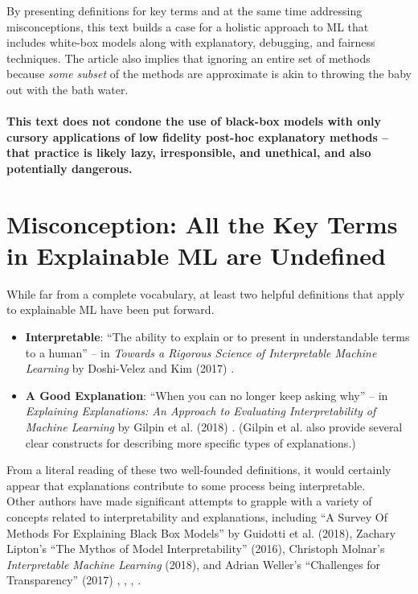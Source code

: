 \documentclass{article}
\begin{document}
By presenting definitions for key terms and at the same time addressing misconceptions, this text builds a case for a holistic approach to ML that includes white-box models along with explanatory, debugging, and fairness techniques. The article also implies that ignoring an entire set of methods because \textit{some subset} of the methods are approximate is akin to throwing the baby out with the bath water. 

\paragraph{This text does not condone the use of black-box models with only cursory applications of low fidelity post-hoc explanatory methods -- that practice is likely lazy, irresponsible, and unethical, and also potentially dangerous.}

\section{Misconception: All the Key Terms in Explainable ML are Undefined}

While far from a complete vocabulary, at least two helpful definitions that apply to explainable ML have been put forward.

\begin{itemize}
\item \textbf{Interpretable}: ``The ability to explain or to present in understandable terms to a human'' -- in \textit{Towards a Rigorous Science of Interpretable Machine Learning} by Doshi-Velez and Kim (2017) \cite{been_kim1}.
\item \textbf{A Good Explanation}: ``When you can no longer keep asking why'' -- in \textit{Explaining Explanations: An Approach to Evaluating Interpretability of Machine Learning} by Gilpin et al. (2018) \cite{gilpin2018explaining}. (Gilpin et al. also provide several clear constructs for describing more specific types of explanations.) 
\end{itemize}

From a literal reading of these two well-founded definitions, it would certainly appear that explanations contribute to some process being interpretable.\\
 
Other authors have made significant attempts to grapple with a variety of concepts related to interpretability and explanations, including ``A Survey Of Methods For Explaining Black Box Models'' by Guidotti et al. (2018), Zachary Lipton's ``The Mythos of Model Interpretability'' (2016), Christoph Molnar's \textit{Interpretable Machine Learning} (2018), and Adrian Weller's ``Challenges for Transparency'' (2017) \cite{guidotti2018survey},  \cite{lipton1}, \cite{molnar}, \cite{weller2017challenges}. 
\end{document}
